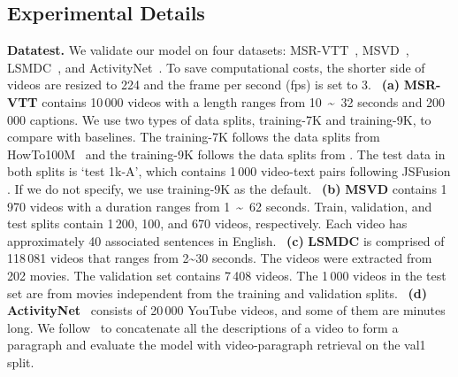 \documentclass[sigconf]{acmart}
\begin{document}
\subsection{Experimental Details}
\noindent
\textbf{Datatest.}
We validate our model on four datasets: MSR-VTT~\cite{xu2016msr}, MSVD~\cite{chen2011collecting}, LSMDC~\cite{rohrbach2015long}, and ActivityNet~\cite{ caba2015activitynet}.
To save computational costs, the shorter side of videos
are resized to 224 and the frame per second (fps) is set to 3.
~\textbf{(a)}
\textbf{MSR-VTT} contains 10\,000 videos with a length
ranges from 10~\textasciitilde~32 seconds and 200\,000 captions.
We use two types of data splits, \textsf{training-7K} and \textsf{training-9K},
to compare with baselines.
The \textsf{training-7K} follows the data splits from HowTo100M~\cite{miech2019howto100m}
and the \textsf{training-9K} follows the data splits from \cite{gabeur2020multi}.
The test data in both splits is `\textsf{test 1k-A}',
which contains 1\,000 video-text pairs following JSFusion \cite{yu2018joint}.
If we do not specify, we use \textsf{training-9K} as the default.
~\textbf{(b)}
\textbf{MSVD} contains 1\,970 videos
with a duration ranges from 1~\textasciitilde~62 seconds.
Train, validation, and test splits contain 1\,200, 100, and 670 videos, respectively.
Each video has approximately 40 associated sentences in English.
~\textbf{(c)}
\textbf{LSMDC} is comprised of 118\,081
videos that ranges from 2\textasciitilde30 seconds.
The videos were extracted from 202 movies.
The validation set contains 7\,408 videos.
The 1\,000 videos in the test set are from movies independent
from the training and validation splits.
~\textbf{(d)}
\textbf{ActivityNet}~\cite{heilbron2014collecting, caba2015activitynet}
consists of 20\,000 YouTube videos, and some of them are minutes long.
We follow~\cite{zhang2018cross,gabeur2020multi} to concatenate
all the descriptions of a video to form a paragraph and evaluate the
model with video-paragraph retrieval on the \textsf{val1} split.
\end{document}
